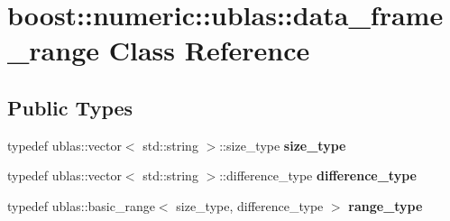 \hypertarget{classboost_1_1numeric_1_1ublas_1_1data__frame__range}{}\section{boost\+:\+:numeric\+:\+:ublas\+:\+:data\+\_\+frame\+\_\+range Class Reference}
\label{classboost_1_1numeric_1_1ublas_1_1data__frame__range}
\subsection*{Public Types}
\begin{DoxyCompactItemize}
\item 
typedef ublas\+::vector$<$ std\+::string $>$\+::size\+\_\+type {\bfseries size\+\_\+type}\hypertarget{classboost_1_1numeric_1_1ublas_1_1data__frame__range_a96ba76900a3223b6d6eeffcc0a7c800b}{}\label{classboost_1_1numeric_1_1ublas_1_1data__frame__range_a96ba76900a3223b6d6eeffcc0a7c800b}

\item 
typedef ublas\+::vector$<$ std\+::string $>$\+::difference\+\_\+type {\bfseries difference\+\_\+type}\hypertarget{classboost_1_1numeric_1_1ublas_1_1data__frame__range_aea2c29c890553242e21cae65aeda39e1}{}\label{classboost_1_1numeric_1_1ublas_1_1data__frame__range_aea2c29c890553242e21cae65aeda39e1}

\item 
typedef ublas\+::basic\+\_\+range$<$ size\+\_\+type, difference\+\_\+type $>$ {\bfseries range\+\_\+type}\hypertarget{classboost_1_1numeric_1_1ublas_1_1data__frame__range_a4e56278ca0fac0eae88c62f2390b345d}{}\label{classboost_1_1numeric_1_1ublas_1_1data__frame__range_a4e56278ca0fac0eae88c62f2390b345d}

\end{DoxyCompactItemize}
